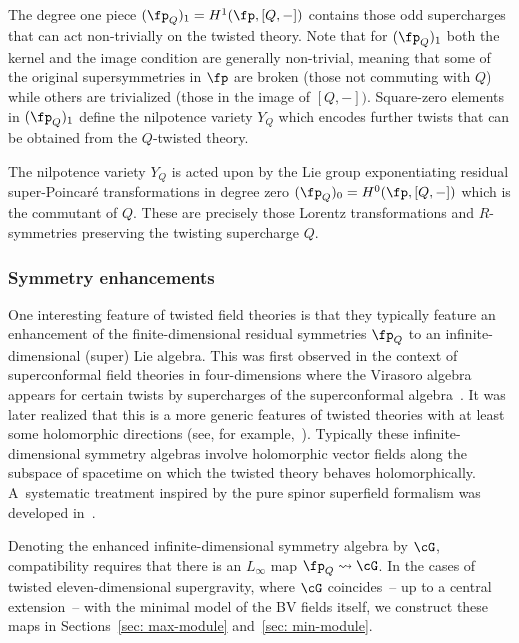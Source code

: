 \documentclass[pdftex]{sigma}
\numberwithin{equation}{section}
\theoremstyle{definition}
\begin{document}
The degree one piece $(\fp_Q)_1 = H^{1}(\fp , [Q,-])$ contains those odd supercharges that can act non-trivially on the twisted theory. Note that for $(\fp_Q)_1$ both the kernel and the image condition are generally non-trivial, meaning that some of the original supersymmetries in $\fp$ are broken (those not commuting with $Q$) while others are trivialized (those in the image of $[Q,-])$. Square-zero elements in $(\fp_Q)_1$ define the nilpotence variety $Y_{Q}$ which encodes further twists that can be obtained from the $Q$-twisted theory.

The nilpotence variety $Y_{Q}$ is acted upon by the Lie group exponentiating residual super-Poincar\'e transformations in degree zero $(\fp_Q)_0 = H^0(\fp, [Q,-])$ which is the commutant of $Q$. These are precisely those Lorentz transformations and $R$-symmetries preserving the twisting supercharge $Q$.

\subsubsection{Symmetry enhancements}
One interesting feature of twisted field theories is that they typically feature an enhancement of the finite-dimensional residual symmetries $\fp_Q$ to an infinite-dimensional (super) Lie algebra. This was first observed in the context of superconformal field theories in four-dimensions where the Virasoro algebra appears for certain twists by supercharges of the superconformal algebra~\cite{Beem:2013sza}. It was later realized that this is a more generic features of twisted theories with at least some holomorphic directions (see, for example,~\cite{Bomans:2023mkd, Garner:2023wrc, RSW, RW,SCA}). Typically these infinite-dimensional symmetry algebras involve holomorphic vector fields along the subspace of spacetime on which the twisted theory behaves holomorphically. A~systematic treatment inspired by the pure spinor superfield formalism was developed in~\cite{LSCA}.

Denoting the enhanced infinite-dimensional symmetry algebra by $\cG$, compatibility requires that there is an $L_\infty$ map
$\fp_Q \rightsquigarrow \cG $.
In the cases of twisted eleven-dimensional supergravity, where $\cG$ coincides~-- up to a central extension~-- with the minimal model of the BV fields itself, we construct these maps in Sections~\ref{sec: max-module} and~\ref{sec: min-module}.
\end{document}
